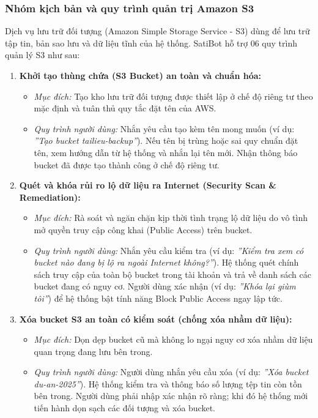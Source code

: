 \documentclass[a4paper,12pt]{article}
\begin{document}
\subsubsection{Nhóm kịch bản và quy trình quản trị Amazon S3}

Dịch vụ lưu trữ đối tượng (Amazon Simple Storage Service - S3) dùng để lưu trữ tập tin, bản sao lưu và dữ liệu tĩnh của hệ thống. SatiBot hỗ trợ 06 quy trình quản lý S3 như sau:

\begin{enumerate}
  \item \textbf{Khởi tạo thùng chứa (S3 Bucket) an toàn và chuẩn hóa:}
  \begin{itemize}
    \item \textit{Mục đích:} Tạo kho lưu trữ đối tượng được thiết lập ở chế độ riêng tư theo mặc định và tuân thủ quy tắc đặt tên của AWS.
    \item \textit{Quy trình người dùng:} Nhắn yêu cầu tạo kèm tên mong muốn (ví dụ: \textit{''Tạo bucket tailieu-backup''}). Nếu tên bị trùng hoặc sai quy chuẩn đặt tên, xem hướng dẫn từ hệ thống và nhắn lại tên mới. Nhận thông báo bucket đã được tạo thành công ở chế độ riêng tư.
  \end{itemize}

  \item \textbf{Quét và khóa rủi ro lộ dữ liệu ra Internet (Security Scan \& Remediation):}
  \begin{itemize}
    \item \textit{Mục đích:} Rà soát và ngăn chặn kịp thời tình trạng lộ dữ liệu do vô tình mở quyền truy cập công khai (Public Access) trên bucket.
    \item \textit{Quy trình người dùng:} Nhắn yêu cầu kiểm tra (ví dụ: \textit{''Kiểm tra xem có bucket nào đang bị lộ ra ngoài Internet không?''}). Hệ thống quét chính sách truy cập của toàn bộ bucket trong tài khoản và trả về danh sách các bucket đang có nguy cơ. Người dùng xác nhận (ví dụ: \textit{''Khóa lại giùm tôi''}) để hệ thống bật tính năng Block Public Access ngay lập tức.
  \end{itemize}

  \item \textbf{Xóa bucket S3 an toàn có kiểm soát (chống xóa nhầm dữ liệu):}
  \begin{itemize}
    \item \textit{Mục đích:} Dọn dẹp bucket cũ mà không lo ngại nguy cơ xóa nhầm dữ liệu quan trọng đang lưu bên trong.
    \item \textit{Quy trình người dùng:} Người dùng nhắn yêu cầu xóa (ví dụ: \textit{''Xóa bucket du-an-2025''}). Hệ thống kiểm tra và thông báo số lượng tệp tin còn tồn bên trong. Người dùng phải nhập xác nhận rõ ràng; khi đó hệ thống mới tiến hành dọn sạch các đối tượng và xóa bucket.
  \end{itemize}


\end{enumerate}
\end{document}
